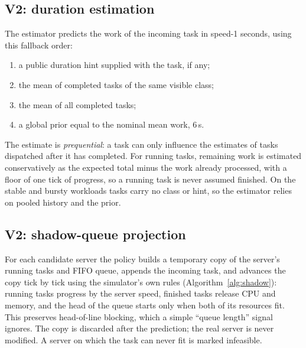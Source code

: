 \documentclass[11pt,a4paper]{article}
\begin{document}
\subsection{V2: duration estimation}
The estimator predicts the work of the incoming task in speed-1 seconds, using this fallback order:
\begin{enumerate}
  \item a public duration hint supplied with the task, if any;
  \item the mean of completed tasks of the same visible class;
  \item the mean of all completed tasks;
  \item a global prior equal to the nominal mean work, 6\,s.
\end{enumerate}
The estimate is \emph{prequential}: a task can only influence the estimates of tasks dispatched after it has
completed. For running tasks, remaining work is estimated conservatively as the expected total minus the
work already processed, with a floor of one tick of progress, so a running task is never assumed finished.
On the stable and bursty workloads tasks carry no class or hint, so the estimator relies on pooled history
and the prior.

\subsection{V2: shadow-queue projection}\label{sec:shadow}
For each candidate server the policy builds a temporary copy of the server's running tasks and FIFO queue,
appends the incoming task, and advances the copy tick by tick using the simulator's own rules
(Algorithm~\ref{alg:shadow}): running tasks progress by the server speed, finished tasks release CPU and
memory, and the head of the queue starts only when both of its resources fit. This preserves head-of-line
blocking, which a simple ``queue length'' signal ignores. The copy is discarded after the prediction; the
real server is never modified. A server on which the task can never fit is marked infeasible.
\end{document}
